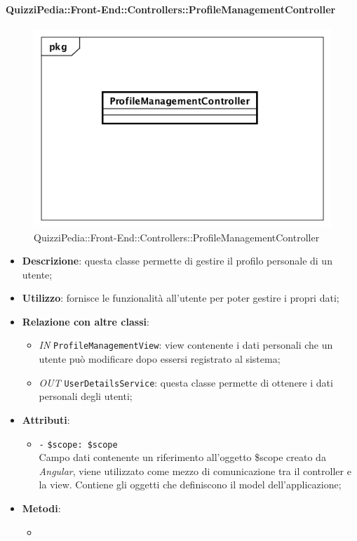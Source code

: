 \paragraph{QuizziPedia::Front-End::Controllers::ProfileManagementController}
\begin{figure}
	\centering
	\includegraphics[scale=0.45]{UML/Classi/Front-End/QuizziPedia_Front-end_Controller_ProfileManagementController.png}
	\caption{QuizziPedia::Front-End::Controllers::ProfileManagementController}
\end{figure}
\begin{itemize}
	\item \textbf{Descrizione}: questa classe permette di gestire il profilo personale di un utente; 
	\item \textbf{Utilizzo}: fornisce le funzionalità all'utente per poter gestire i propri dati;
	\item \textbf{Relazione con altre classi}:
	\begin{itemize}
		\item \textit{IN} \texttt{ProfileManagementView}: view contenente i dati personali che un utente può modificare dopo essersi registrato al sistema;
		\item \textit{OUT} \texttt{UserDetailsService}: questa classe permette di ottenere i dati personali degli utenti;
	\end{itemize}
	\item \textbf{Attributi}:
	\begin{itemize}
		\item \texttt{-} \texttt{\$scope: \$scope} \\
		Campo dati contenente un riferimento all’oggetto \$scope creato da \textit{Angular}, viene utilizzato come mezzo di comunicazione tra il controller e la view. Contiene gli oggetti che definiscono il model dell’applicazione;
	\end{itemize}
	\item \textbf{Metodi}:
	\begin{itemize}
		\item 
	\end{itemize}
\end{itemize}

